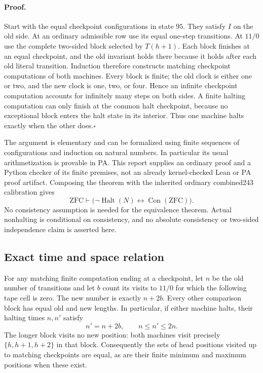 \paragraph{Proof.}
Start with the equal checkpoint configurations in state $95$.  They satisfy
$I$ on the old side.  At an ordinary admissible row use its equal one-step
transitions.  At $11/0$ use the complete two-sided block selected by
$T(h+1)$.  Each block finishes at an equal checkpoint, and the old invariant
holds there because it holds after each old literal transition.  Induction
therefore constructs matching checkpoint computations of both machines.
Every block is finite; the old clock is either one or two, and the new
clock is one, two, or four.  Hence an infinite checkpoint computation
accounts for infinitely many steps on both sides.  A finite halting
computation can only finish at the common halt checkpoint, because no
exceptional block enters the halt state in its interior.  Thus one machine
halts exactly when the other does.\hfill$\square$

The argument is elementary and can be formalized using finite sequences of
configurations and induction on natural numbers.  In particular its usual
arithmetization is provable in PA.  This report supplies an ordinary proof
and a Python checker of its finite premises, not an already kernel-checked
Lean or PA proof artifact.  Composing the theorem with the inherited
ordinary combined243 calibration gives
\[
\mathrm{ZFC}\vdash
\bigl(\neg\operatorname{Halt}(N)\leftrightarrow
       \operatorname{Con}(\mathrm{ZFC})\bigr).
\]
No consistency assumption is needed for the equivalence theorem.  Actual
nonhalting is conditional on consistency, and no absolute consistency or
two-sided independence claim is asserted here.

\subsection{Exact time and space relation}

For any matching finite computation ending at a checkpoint, let $n$ be the
old number of transitions and let $b$ count its visits to $11/0$ for which
the following tape cell is zero.  The new number is exactly $n+2b$.
Every other comparison block has equal old and new lengths.  In particular,
if either machine halts, their halting times $n,n'$ satisfy
\[
n'=n+2b,\qquad n\leq n'\leq2n.
\]
The longer block visits no new position: both machines visit precisely
$\{h,h+1,h+2\}$ in that block.  Consequently the sets of head positions
visited up to matching checkpoints are equal, as are their finite minimum
and maximum positions when these exist.

